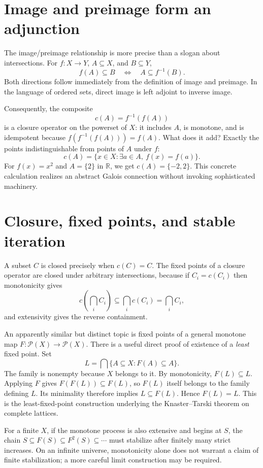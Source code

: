 \section{Image and preimage form an adjunction}

The image/preimage relationship is more precise than a slogan about intersections. For \(f:X\to Y\), \(A\subseteq X\), and \(B\subseteq Y\),
\[
 \boxed{f(A)\subseteq B\quad\Longleftrightarrow\quad A\subseteq f^{-1}(B).}
\]
Both directions follow immediately from the definition of image and preimage. In the language of ordered sets, direct image is left adjoint to inverse image.

Consequently, the composite
\[
 c(A)=f^{-1}(f(A))
\]
is a closure operator on the powerset of \(X\): it includes \(A\), is monotone, and is idempotent because \(f(f^{-1}(f(A)))=f(A)\). What does it add? Exactly the points indistinguishable from points of \(A\) under \(f\):
\[
 c(A)=\{x\in X:\exists a\in A,\ f(x)=f(a)\}.
\]
For \(f(x)=x^2\) and \(A=\{2\}\) in \(\mathbb R\), we get \(c(A)=\{-2,2\}\). This concrete calculation realizes an abstract Galois connection without invoking sophisticated machinery.

\section{Closure, fixed points, and stable iteration}

A subset \(C\) is closed precisely when \(c(C)=C\). The fixed points of a closure operator are closed under arbitrary intersections, because if \(C_i=c(C_i)\) then monotonicity gives
\[
 c\!\left(\bigcap_i C_i\right)\subseteq \bigcap_i c(C_i)=\bigcap_i C_i,
\]
and extensivity gives the reverse containment.

An apparently similar but distinct topic is fixed points of a general monotone map \(F:\mathcal P(X)\to\mathcal P(X)\). There is a useful direct proof of existence of a \emph{least} fixed point. Set
\[
 L=\bigcap\{A\subseteq X:F(A)\subseteq A\}.
\]
The family is nonempty because \(X\) belongs to it. By monotonicity, \(F(L)\subseteq L\). Applying \(F\) gives \(F(F(L))\subseteq F(L)\), so \(F(L)\) itself belongs to the family defining \(L\). Its minimality therefore implies \(L\subseteq F(L)\). Hence \(F(L)=L\). This is the least-fixed-point construction underlying the Knaster--Tarski theorem on complete lattices.

For a finite \(X\), if the monotone process is also extensive and begins at \(S\), the chain \(S\subseteq F(S)\subseteq F^2(S)\subseteq\cdots\) must stabilize after finitely many strict increases. On an infinite universe, monotonicity alone does not warrant a claim of finite stabilization; a more careful limit construction may be required.

